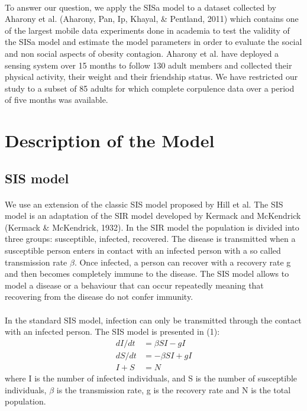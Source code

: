 \documentclass[11pt]{article}
\begin{document}
\paragraph{}
To answer our question, we apply the SISa model to a dataset collected by Aharony et al. (Aharony, Pan, Ip, Khayal, \& Pentland, 2011) which contains one of the largest mobile data experiments done in academia to test the validity of the SISa model and estimate the model parameters in order to evaluate the social and non social aspects of obesity contagion. Aharony et al. have deployed a sensing system over 15 months to follow 130 adult members and collected their physical activity, their weight and their friendship status. We have restricted our study to a subset of 85 adults for which complete corpulence data over a period of five months was available.


\section{Description of the Model}

\subsection{SIS model}
\paragraph{}
We use an extension of the classic SIS model proposed by Hill et al. The SIS model is an adaptation of the SIR model developed by Kermack and McKendrick (Kermack \& McKendrick, 1932). In the SIR model the population is divided into three groups: susceptible, infected, recovered. The disease is transmitted when a susceptible person enters in contact with an infected person with a so called transmission rate $\beta$. Once infected, a person can recover with a recovery rate g and then becomes completely immune to the disease. The SIS model allows to model a disease or a behaviour that can occur repeatedly meaning that recovering from the disease do not confer immunity.

\paragraph{}

In the standard SIS model, infection can only be transmitted through the contact with an infected person. The SIS model is presented in (1):
\begin{align}
      dI/dt  & =  \beta SI-gI \nonumber\\
      dS/dt   & =  -\beta SI+gI \\ 
      I+S & =  N \nonumber
\end{align}
where I is the number of infected individuals, and S is the number of susceptible individuals, $\beta$ is the transmission rate, g is the recovery rate and N is the total population. 
\end{document}
